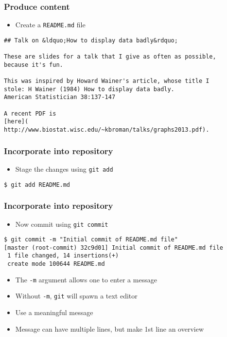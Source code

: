 \documentclass[12pt,t]{beamer}
\newcommand{\hilit}{\color{hilit}}
\newcommand{\bi}{\begin{itemize}}
\newcommand{\bbi}{\vspace{24pt} \begin{itemize} \itemsep8pt}
\newcommand{\ei}{\end{itemize}}
\begin{document}
\begin{frame}[fragile]
\frametitle{Produce content}
\bbi
\item Create a {\tt README.md} file
\ei

\bigskip 
\begin{lstlisting}
## Talk on &ldquo;How to display data badly&rdquo;

These are slides for a talk that I give as often as possible,
because it's fun.

This was inspired by Howard Wainer's article, whose title I
stole: H Wainer (1984) How to display data badly.
American Statistician 38:137-147

A recent PDF is
[here](
http://www.biostat.wisc.edu/~kbroman/talks/graphs2013.pdf).
\end{lstlisting}

\end{frame}


\begin{frame}[fragile]
\frametitle{Incorporate into repository}
\bbi
\item Stage the changes using {\tt \hilit git add}
\ei

\begin{lstlisting}
$ git add README.md
\end{lstlisting}

\end{frame}

\begin{frame}[fragile]
\frametitle{Incorporate into repository}
\bbi
\item Now commit using {\tt \hilit git commit}
\ei

\begin{lstlisting}
$ git commit -m "Initial commit of README.md file"
[master (root-commit) 32c9d01] Initial commit of README.md file
 1 file changed, 14 insertions(+)
 create mode 100644 README.md
\end{lstlisting}

\bi
\item The \texttt{-m} argument allows one to enter a message
\item Without \texttt{-m}, \texttt{git} will spawn a text editor
\item Use a meaningful message
\item Message can have multiple lines, but make 1st line an overview
\ei

\end{frame}
\end{document}
